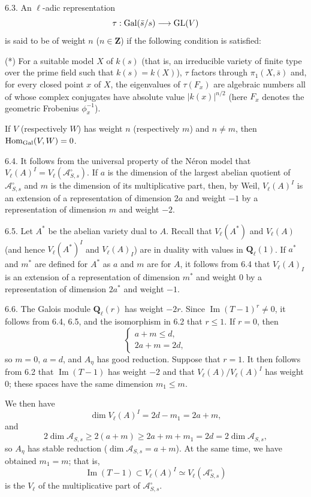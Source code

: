 6.3. An $\ell$-adic representation
\[
 \tau:\operatorname{Gal}(\bar s/s)\longrightarrow\mathrm{GL}(V)
\]
is said to be of weight $n$ ($n\in\mathbf Z$) if the following condition
is satisfied:

(*) For a suitable model $X$ of $k(s)$ (that is, an irreducible variety
of finite type over the prime field such that $k(s)=k(X)$), $\tau$
factors through $\pi_1(X,\bar s)$ and, for every closed point $x$ of
$X$, the eigenvalues of $\tau(F_x)$ are algebraic numbers all of whose
complex conjugates have absolute value $|k(x)|^{n/2}$ (here $F_x$
denotes the geometric Frobenius $\phi_x^{-1}$).


If $V$ (respectively $W$) has weight $n$ (respectively $m$) and
$n\neq m$, then $\operatorname{Hom}_{\operatorname{Gal}}(V,W)=0$.

6.4. It follows from the universal property of the N\'eron model that
$V_\ell(A)^I=V_\ell(\mathcal A^\circ_{S,s})$. If $a$ is the dimension
of the largest abelian quotient of $\mathcal A^\circ_{S,s}$ and $m$ is
the dimension of its multiplicative part, then, by Weil,
$V_\ell(A)^I$ is an extension of a representation of dimension $2a$ and
weight $-1$ by a representation of dimension $m$ and weight $-2$.

6.5. Let $A^*$ be the abelian variety dual to $A$. Recall that
$V_\ell(A^*)$ and $V_\ell(A)$ (and hence $V_\ell(A^*)^I$ and
$V_\ell(A)_I$) are in duality with values in $\mathbf Q_\ell(1)$. If
$a^*$ and $m^*$ are defined for $A^*$ as $a$ and $m$ are for $A$, it
follows from 6.4 that $V_\ell(A)_I$ is an extension of a representation
of dimension $m^*$ and weight $0$ by a representation of dimension
$2a^*$ and weight $-1$.

6.6. The Galois module $\mathbf Q_\ell(r)$ has weight $-2r$. Since
$\operatorname{Im}(T-1)^r\neq 0$, it follows from 6.4, 6.5, and the isomorphism in 6.2
that $r\leq 1$. If $r=0$, then
\[
\left\{
\begin{array}{l}
a+m\leq d,\\[1ex]
2a+m=2d,
\end{array}
\right.
\]
so $m=0$, $a=d$, and $A_\eta$ has good reduction. Suppose that $r=1$.
It then follows from 6.2 that $\operatorname{Im}(T-1)$ has weight $-2$ and that
$V_\ell(A)/V_\ell(A)^I$ has weight $0$; these spaces have the same
dimension $m_1\leq m$.

We then have
\[
 \dim V_\ell(A)^I=2d-m_1=2a+m,
\]
and
\[
 2\dim\mathcal A_{S,s}\geq 2(a+m)\geq
 2a+m+m_1=2d=2\dim\mathcal A_{S,s},
\]
so $A_\eta$ has stable reduction
($\dim\mathcal A_{S,s}=a+m$). At the same time, we have obtained
$m_1=m$; that is,
\[
 \operatorname{Im}(T-1)\subset V_\ell(A)^I\simeq
 V_\ell(\mathcal A^\circ_{S,s})
\]
is the $V_\ell$ of the multiplicative part of
$\mathcal A^\circ_{S,s}$.

